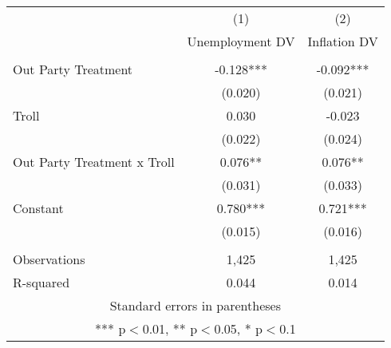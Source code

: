 \documentclass[]{article}
\begin{document}
\begin{tabular}{lcc} \hline
 & (1) & (2) \\
  & Unemployment DV & Inflation DV \\ \hline
 &  &  \\
Out Party Treatment & -0.128*** & -0.092*** \\
 & (0.020) & (0.021) \\
Troll & 0.030 & -0.023 \\
 & (0.022) & (0.024) \\
Out Party Treatment x Troll & 0.076** & 0.076** \\
 & (0.031) & (0.033) \\
Constant & 0.780*** & 0.721*** \\
 & (0.015) & (0.016) \\
 &  &  \\
Observations & 1,425 & 1,425 \\
 R-squared & 0.044 & 0.014 \\ \hline
\multicolumn{3}{c}{ Standard errors in parentheses} \\
\multicolumn{3}{c}{ *** p$<$0.01, ** p$<$0.05, * p$<$0.1} \\
\end{tabular}
\end{document}
